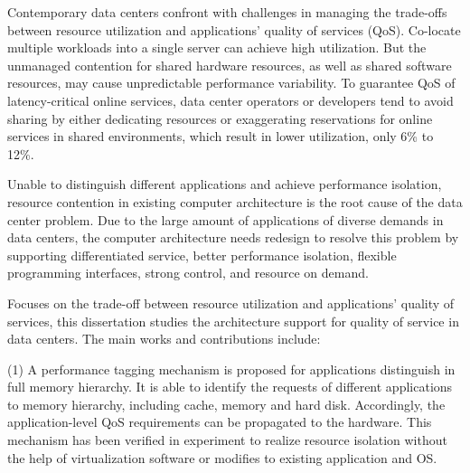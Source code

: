 \begin{cabstract}

\end{cabstract}


\begin{eabstract}
  Contemporary data centers confront with challenges in
  managing the trade-offs between resource utilization and
  applications' quality of services (QoS).
  Co-locate multiple workloads into a single server can
  achieve high utilization.
  But the unmanaged contention for shared hardware resources,
  as well as shared software resources,
  may cause unpredictable performance variability.
  To guarantee QoS of latency-critical online services,
  data center operators or developers tend to avoid sharing by
  either dedicating resources or exaggerating reservations
  for online services in shared environments,
  which result in lower utilization, only 6\% to 12\%.

  Unable to distinguish different applications and achieve performance isolation,
  resource contention in existing computer architecture is the root cause of
  the data center problem.
  Due to the large amount of applications of diverse demands in data centers,
  the computer architecture needs redesign to resolve this problem
  by supporting differentiated service, better performance isolation,
  flexible programming interfaces, strong control, and resource on demand.
  
  Focuses on the trade-off between resource utilization and applications'
  quality of services, this dissertation studies the architecture support
  for quality of service in data centers.
  The main works and contributions include:

  (1) A performance tagging mechanism is proposed for applications distinguish
      in full memory hierarchy. It is able to identify the requests of
      different applications to memory hierarchy, including cache, memory and hard disk.
      Accordingly, the application-level QoS requirements can be propagated to
      the hardware. This mechanism has been verified in experiment to realize
      resource isolation without the help of virtualization software or
      modifies to existing application and OS.


\end{eabstract}
